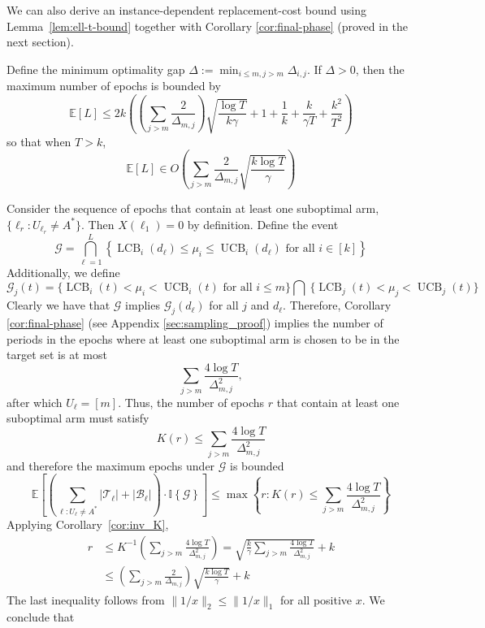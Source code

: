 \documentclass[opre,blindrev]{informs3}
\newcommand{\UCB}{\operatorname{UCB}}
\newcommand{\LCB}{\operatorname{LCB}}
\newcommand{\ind}[1]{\mathbb{I}\left\{#1\right\}}
\newcommand{\bE}[1]{{\mathbb{E}\left[#1\right]}}
\begin{document}
\begin{APPENDICES}
We can also derive an instance-dependent replacement-cost bound using Lemma~\ref{lem:ell-t-bound} together with Corollary \ref{cor:final-phase} (proved in the next section).
\begin{lemma}\label{lem:delta-max-epoch}
    Define the minimum optimality gap \(\Delta:=\min_{i\leq m, j>m}\Delta_{i,j}\). If \(\Delta>0\), then the maximum number of epochs is bounded by
    \[\bE{L}\leq 2k\left(\left(\sum_{j>m}\frac{2}{\Delta_{m,j}}\right)\sqrt{\frac{\log T}{k\gamma}}+1+\frac{1}{k}+\frac{k}{\gamma T}+\frac{k^2}{T^2}\right)\]
    so that when \(T> k\),
    \[\bE{L}\in O\left(\sum_{j>m}\frac{2}{\Delta_{m,j}}\sqrt{\frac{k\log T}{\gamma}}\right)\]
\end{lemma}
    Consider the sequence of epochs that contain at least one suboptimal arm, \(\{\ell_r: U_{\ell_r}\neq A^*\}\). Then \(X(\ell_1)=0\) by definition. Define the event 
    \[\mathcal{G}=\bigcap_{\ell=1}^L\left\{\LCB_i(d_{\ell})\leq \mu_i\leq\UCB_i(d_{\ell}) \text{ for all } i\in[k]\right\}\]
    Additionally, we define 
    \[
    \mathcal{G}_j(t)=\bigg\{\LCB_i(t)<\mu_i<\UCB_i(t) \text{ for all } i\leq m\bigg\} \bigcap ~\bigg\{\LCB_j(t)<\mu_j<\UCB_j(t)\bigg\}
    \]
    Clearly we have that \(\mathcal{G}\) implies \(\mathcal{G}_j(d_{\ell})\) for all \(j\) and \(d_{\ell}\). Therefore, Corollary \ref{cor:final-phase} (see Appendix \ref{sec:sampling_proof}) implies the number of periods in the epochs where at least one suboptimal arm is chosen to be in the target set is at most
    \[\sum_{j>m}\frac{4\log T}{\Delta_{m,j}^2},\]
    after which \(U_{\ell}=[m]\). Thus, the number of epochs \(r\) that contain at least one suboptimal arm must satisfy 
    \[K(r)\leq \sum_{j>m}\frac{4\log T}{\Delta_{m,j}^2}\]
    and therefore the maximum epochs under \(\mathcal{G}\) is bounded
    \[\bE{\left(\sum_{\ell:U_{\ell}\neq A^*}|\mathcal{T}_{\ell}|+|\mathcal{B}_{\ell}|\right)\cdot \ind{\mathcal{G}}}\leq \max\left\{r: K(r)\leq \sum_{j>m}\frac{4\log T}{\Delta_{m,j}^2}\right\}\]
    Applying Corollary~\ref{cor:inv_K},
    \begin{align*}
        r&\leq K^{-1}\left(\sum_{j>m}\frac{4\log T}{\Delta_{m,j}^2}\right)=\sqrt{\frac{k}{\gamma}\sum_{j>m}\frac{4\log T}{\Delta_{m,j}^2}}+k\\
        &\leq \left(\sum_{j>m}\frac{2}{\Delta_{m,j}}\right)\sqrt{\frac{k\log T}{\gamma}}+k
    \end{align*}
    The last inequality follows from \(\|1/x\|_2\leq \|1/x\|_1\) for all positive \(x\). We conclude that 

\end{APPENDICES}
\end{document}
